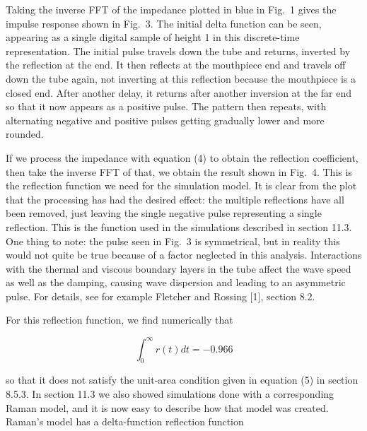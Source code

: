   Taking the inverse FFT of the impedance plotted in blue in Fig.\ 1 gives the 
  impulse response shown in Fig.\ 3. The initial delta function can be seen, 
  appearing as a single digital sample of height 1 in this discrete-time 
  representation. The initial pulse travels down the tube and returns, inverted 
  by the reflection at the end. It then reflects at the mouthpiece end and 
  travels off down the tube again, not inverting at this reflection because the 
  mouthpiece is a closed end. After another delay, it returns after another 
  inversion at the far end so that it now appears as a positive pulse. The 
  pattern then repeats, with alternating negative and positive pulses getting 
  gradually lower and more rounded. 


  If we process the impedance with equation (4) to obtain the reflection 
  coefficient, then take the inverse FFT of that, we obtain the result shown in 
  Fig.\ 4. This is the reflection function we need for the simulation model. It 
  is clear from the plot that the processing has had the desired effect: the 
  multiple reflections have all been removed, just leaving the single negative 
  pulse representing a single reflection. This is the function used in the 
  simulations described in section 11.3. One thing to note: the pulse seen in 
  Fig.\ 3 is symmetrical, but in reality this would not quite be true because 
  of a factor neglected in this analysis. Interactions with the thermal and 
  viscous boundary layers in the tube affect the wave speed as well as the 
  damping, causing wave dispersion and leading to an asymmetric pulse. For 
  details, see for example Fletcher and Rossing [1], section 8.2. 


  For this reflection function, we find numerically that 

  \begin{equation*}\int_0^\infty{r(t) dt}=-0.966\end{equation*} 

  \noindent{}so that it does not satisfy the unit-area condition given in 
  equation (5) in section 8.5.3. In section 11.3 we also showed simulations 
  done with a corresponding Raman model, and it is now easy to describe how 
  that model was created. Raman's model has a delta-function reflection 
  function 

